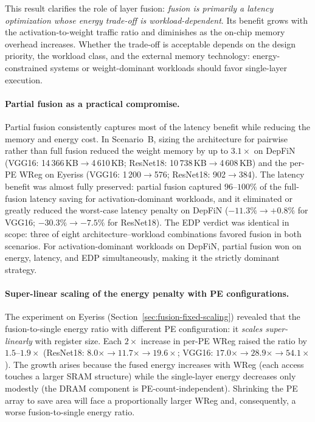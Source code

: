 This result clarifies the role of layer fusion:
\emph{fusion is primarily a latency optimization whose energy
trade-off is workload-dependent}.
Its benefit grows with the activation-to-weight traffic ratio and
diminishes as the on-chip memory overhead increases.
Whether the trade-off is acceptable depends on the design priority,
the workload class, and the external memory technology:
energy-constrained
systems or weight-dominant workloads should favor single-layer
execution.

\paragraph{Partial fusion as a practical compromise.}
Partial fusion consistently captures most of the latency benefit
while reducing the memory and energy cost.
In Scenario~B, sizing the architecture for pairwise rather than
full fusion reduced the weight memory by up to $3.1\times$ on DepFiN
(VGG16: 14\,366\,KB${\to}$4\,610\,KB; ResNet18:
10\,738\,KB${\to}$4\,608\,KB) and the per-PE WReg on Eyeriss
(VGG16: 1\,200${\to}$576; ResNet18: 902${\to}$384).
The latency benefit was almost fully preserved: partial fusion
captured $96$--$100\%$ of the full-fusion latency saving for
activation-dominant workloads, and it eliminated or greatly reduced
the worst-case latency penalty on DepFiN
($-11.3\% \to +0.8\%$ for VGG16; $-30.3\% \to -7.5\%$ for
ResNet18).
The EDP verdict was identical in scope: three of eight
architecture--workload combinations favored fusion in both
scenarios.
For activation-dominant workloads on DepFiN, partial fusion
won on energy, latency, and EDP simultaneously, making it the
strictly dominant strategy.

\paragraph{Super-linear scaling of the energy penalty with PE configurations.}
The experiment on Eyeriss
(Section~\ref{sec:fusion-fixed-scaling}) revealed that the
fusion-to-single energy ratio with different PE configuration: it
\emph{scales super-linearly} with register size.
Each $2\times$ increase in per-PE WReg raised the ratio by
$1.5$--$1.9\times$ (ResNet18: $8.0\times \to 11.7\times \to
19.6\times$; VGG16: $17.0\times \to 28.9\times \to 54.1\times$).
The growth arises because the fused energy increases with WReg
(each access touches a larger SRAM structure) while the
single-layer energy decreases only modestly (the DRAM component is
PE-count-independent).
Shrinking the PE array to save area will face a
proportionally larger WReg and, consequently, a worse
fusion-to-single energy ratio.



